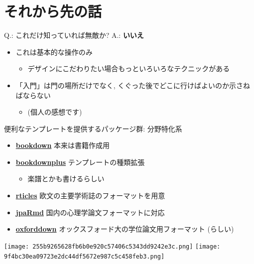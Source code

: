 \documentclass[
  ignorenonframetext,
]{beamer}
\providecommand{\tightlist}{%
  \setlength{\itemsep}{0pt}\setlength{\parskip}{0pt}}
\begin{document}
\hypertarget{ux305dux308cux304bux3089ux5148ux306eux8a71}{%
\section{それから先の話}\label{ux305dux308cux304bux3089ux5148ux306eux8a71}}

\begin{frame}{Q.: これだけ知っていれば無敵か?}
\protect\hypertarget{q.-ux3053ux308cux3060ux3051ux77e5ux3063ux3066ux3044ux308cux3070ux7121ux6575ux304b}{}
A.: \textbf{いいえ}

\begin{itemize}
\item
  これは基本的な操作のみ

  \begin{itemize}
  \tightlist
  \item
    デザインにこだわりたい場合もっといろいろなテクニックがある
  \end{itemize}
\item
  「入門」は門の場所だけでなく,
  くぐった後でどこに行けばよいのか示さねばならない

  \begin{itemize}
  \tightlist
  \item
    (個人の感想です)
  \end{itemize}
\end{itemize}
\end{frame}

\begin{frame}{便利なテンプレートを提供するパッケージ群: 分野特化系}
\protect\hypertarget{ux4fbfux5229ux306aux30c6ux30f3ux30d7ux30ecux30fcux30c8ux3092ux63d0ux4f9bux3059ux308bux30d1ux30c3ux30b1ux30fcux30b8ux7fa4-ux5206ux91ceux7279ux5316ux7cfb}{}
\begin{itemize}
\item
  \href{https://bookdown.org/yihui/bookdown/}{\textbf{bookdown}}
  本来は書籍作成用
\item
  \href{https://github.com/pzhaonet/bookdownplus}{\textbf{bookdownplus}}
  テンプレートの種類拡張

  \begin{itemize}
  \tightlist
  \item
    楽譜とかも書けるらしい
  \end{itemize}
\item
  \href{https://github.com/rstudio/rticles}{\textbf{rticles}}
  欧文の主要学術誌のフォーマットを用意
\item
  \href{https://github.com/ykunisato/jpaRmd}{\textbf{jpaRmd}}
  国内の心理学論文フォーマットに対応
\item
  \href{https://ulyngs.github.io/oxforddown/}{\textbf{oxforddown}}
  オックスフォード大の学位論文用フォーマット (らしい)
\end{itemize}

\begin{center}

\texttt{[image: 255b9265628fb6b0e920c57406c5343dd9242e3c.png]}
\texttt{[image: 9f4bc30ea09723e2dc44df5672e987c5c458feb3.png]}

\end{center}
\end{frame}
\end{document}
